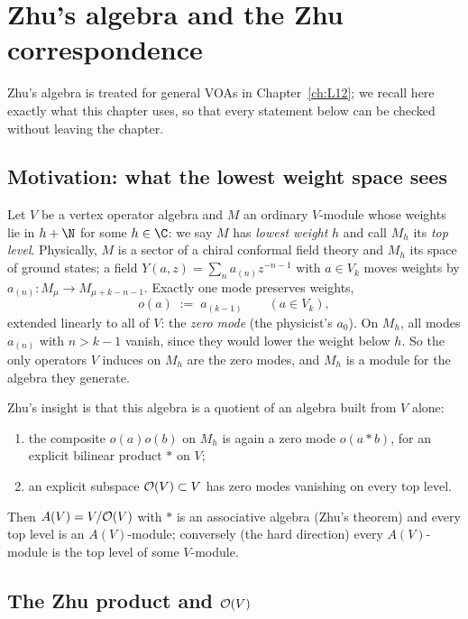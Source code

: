\section{Zhu's algebra and the Zhu correspondence}\label{ch12:sec:zhu}

Zhu's algebra is treated for general VOAs in Chapter~\ref{ch:L12}; we recall here exactly what this
chapter uses, so that every statement below can be checked without leaving the chapter.

\subsection{Motivation: what the lowest weight space sees}

Let $V$ be a vertex operator algebra and $M$ an ordinary $V$-module whose weights lie in $h+\N$ for
some $h\in\C$: we say $M$ has \emph{lowest weight} $h$ and call $M_h$ its \emph{top level}.  Physically,
$M$ is a sector of a chiral conformal field theory and $M_h$ its space of ground states; a field
$Y(a,z)=\sum_n a_{(n)}z^{-n-1}$ with $a\in V_k$ moves weights by $a_{(n)}:M_\mu\to M_{\mu+k-n-1}$.
Exactly one mode preserves weights,
\begin{equation*}
  o(a)\;:=\;a_{(k-1)}\qquad(a\in V_k),
\end{equation*}
extended linearly to all of $V$: the \emph{zero mode} (the physicist's $a_0$).  On $M_h$, all modes
$a_{(n)}$ with $n>k-1$ vanish, since they would lower the weight below $h$.  So the only operators $V$
induces on $M_h$ are the zero modes, and $M_h$ is a module for the algebra they generate.

Zhu's insight is that this algebra is a quotient of an algebra built from $V$ alone:
\begin{enumerate}[label=(\roman*)]
\item the composite $o(a)o(b)$ on $M_h$ is again a zero mode $o(a\ast b)$, for an explicit bilinear
  product $\ast$ on $V$;
\item an explicit subspace $\mathcal{O}(V)\subset V$ has zero modes vanishing on every top level.
\end{enumerate}
Then $A(V)=V/\mathcal{O}(V)$ with $\ast$ is an associative algebra (Zhu's theorem) and every top level
is an $A(V)$-module; conversely (the hard direction) every $A(V)$-module is the top level of some
$V$-module.

\subsection{The Zhu product and \texorpdfstring{$\mathcal{O}(V)$}{O(V)}}

